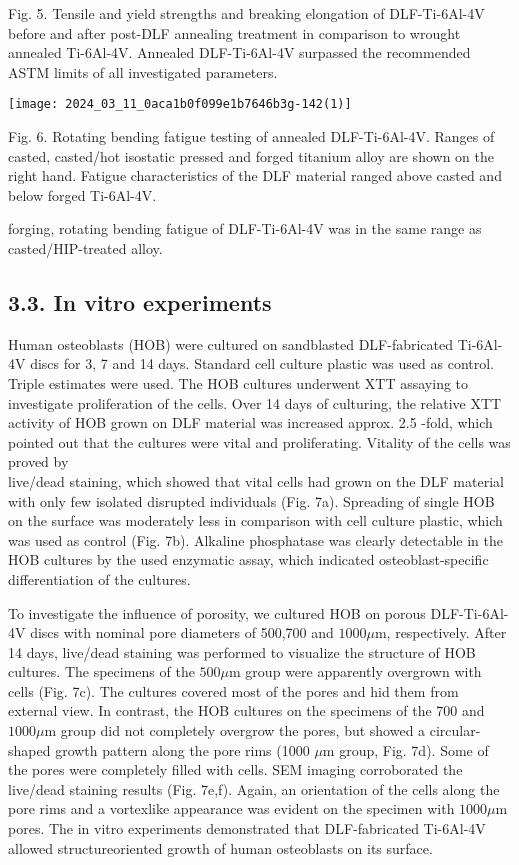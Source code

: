 \documentclass[10pt]{article}
\begin{document}
Fig. 5. Tensile and yield strengths and breaking elongation of DLF-Ti-6Al-4V before and after post-DLF annealing treatment in comparison to wrought annealed Ti-6Al-4V. Annealed DLF-Ti-6Al-4V surpassed the recommended ASTM limits of all investigated parameters.

\begin{center}
\texttt{[image: 2024\_03\_11\_0aca1b0f099e1b7646b3g-142(1)]}
\end{center}

Fig. 6. Rotating bending fatigue testing of annealed DLF-Ti-6Al-4V. Ranges of casted, casted/hot isostatic pressed and forged titanium alloy are shown on the right hand. Fatigue characteristics of the DLF material ranged above casted and below forged Ti-6Al-4V.

forging, rotating bending fatigue of DLF-Ti-6Al-4V was in the same range as casted/HIP-treated alloy.

\subsection*{3.3. In vitro experiments}
Human osteoblasts (HOB) were cultured on sandblasted DLF-fabricated Ti-6Al-4V discs for 3, 7 and 14 days. Standard cell culture plastic was used as control. Triple estimates were used. The HOB cultures underwent XTT assaying to investigate proliferation of the cells. Over 14 days of culturing, the relative XTT activity of HOB grown on DLF material was increased approx. 2.5 -fold, which pointed out that the cultures were vital and proliferating. Vitality of the cells was proved by\\
live/dead staining, which showed that vital cells had grown on the DLF material with only few isolated disrupted individuals (Fig. 7a). Spreading of single HOB on the surface was moderately less in comparison with cell culture plastic, which was used as control (Fig. 7b). Alkaline phosphatase was clearly detectable in the HOB cultures by the used enzymatic assay, which indicated osteoblast-specific differentiation of the cultures.

To investigate the influence of porosity, we cultured HOB on porous DLF-Ti-6Al-4V discs with nominal pore diameters of 500,700 and $1000 \mu \mathrm{m}$, respectively. After 14 days, live/dead staining was performed to visualize the structure of HOB cultures. The specimens of the $500 \mu \mathrm{m}$ group were apparently overgrown with cells (Fig. 7c). The cultures covered most of the pores and hid them from external view. In contrast, the HOB cultures on the specimens of the 700 and $1000 \mu \mathrm{m}$ group did not completely overgrow the pores, but showed a circular-shaped growth pattern along the pore rims (1000 $\mu \mathrm{m}$ group, Fig. 7d). Some of the pores were completely filled with cells. SEM imaging corroborated the live/dead staining results (Fig. 7e,f). Again, an orientation of the cells along the pore rims and a vortexlike appearance was evident on the specimen with $1000 \mu \mathrm{m}$ pores. The in vitro experiments demonstrated that DLF-fabricated Ti-6Al-4V allowed structureoriented growth of human osteoblasts on its surface.
\end{document}
